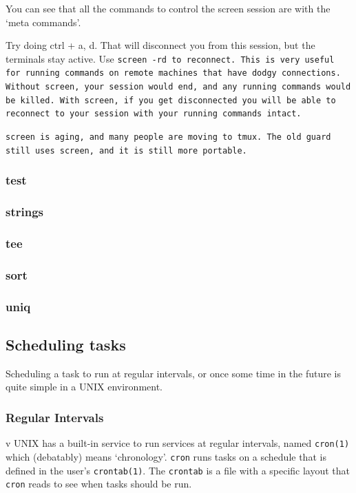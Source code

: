 You can see that all the commands to control the screen session are with the `meta commands'.

Try doing ctrl + a, d. That will disconnect you from this session, but the terminals stay
active. Use \tt{screen -rd} to reconnect. This is very useful for running commands
on remote machines that have dodgy connections. Without \tt{screen}, your session would
end, and any running commands would be killed. With screen, if you get disconnected
you will be able to reconnect to your session with your running commands intact.

\tt{screen} is aging, and many people are moving to \tt{tmux}.  The old guard still
uses screen, and it is still more portable.

\subsubsection{test}
\subsubsection{strings}
\subsubsection{tee}
\subsubsection{sort}
\subsubsection{uniq}


\subsection	{Scheduling tasks  }
\label{subsection:cron}

Scheduling a task to run at regular intervals, or once some time in the future 
is quite simple in a UNIX environment.

\subsubsection{Regular Intervals}v
UNIX has a built-in service to run services at regular intervals, named {\tt cron(1)}
which (debatably) means `chronology'. {\tt cron} runs tasks on a schedule that is
defined in the user's {\tt crontab(1)}. The {\tt crontab} is a file with 
a specific layout that {\tt cron} reads to see when tasks should be run.

